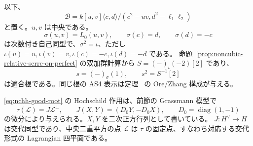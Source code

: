 以下、
\[
\mathcal B=k[u,v]\langle c,d\rangle/(c^2-uv,d^2-\ell_1\ell_2)
\]
と置く。$u,v$ は中央である。
\begin{equation}\label{eq:nchh-sigma}
\sigma(u,v)=L_0(u,v),\qquad\sigma(c)=d,\qquad\sigma(d)=-c
\end{equation}
は次数付き自己同型で、$\sigma^2=\iota$、ただし
$\iota(u)=u,\iota(v)=v,\iota(c)=-c,\iota(d)=-d$ である。
命題~\ref{prop:noncubic-relative-serre-on-perfect} の双加群計算から
$S=(-)_\iota(-2)[2]$ であり、
\begin{equation}\label{eq:nchh-good-root}
s=(-)_\sigma(1),\qquad s^2=S^{-1}[2]
\end{equation}
は適合根である。同じ根の AS4 表示は定理~\cite[\texttt{thm:ore-anticommuting-central}]{QuadricIntrinsic2026} の Ore/Zhang 構成が与える。

\begin{proposition}\label{prop:nchh-root-gale}
\eqref{eq:nchh-good-root} の Hochschild 作用は、前節の Grassmann 模型で
\begin{equation}\label{eq:nchh-involution}
\tau(\mathscr L)=J\mathscr L^{\perp},\qquad
J(X,Y)=(D_0Y,-D_0X),\qquad D_0=\operatorname{diag}(1,-1)
\end{equation}
の微分により与えられる。$X,Y$ を二次正方行列として書いている。
$J:H^{\vee}\to H$ は交代同型であり、中央二重平方の点 $\mathscr L$ は
$\tau$ の固定点、すなわち対応する交代形式の Lagrangian 四平面である。
\end{proposition}

